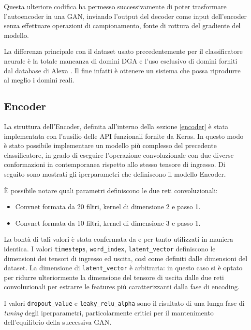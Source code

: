 Questa ulteriore codifica ha permesso successivamente di poter trasformare l'autoencoder in una GAN, inviando l'output del decoder come input dell'encoder senza effettuare operazioni di campionamento, fonte di rottura del gradiente del modello.

La differenza principale con il dataset usato precedentemente per il classificatore neurale è la totale mancanza di domini DGA e l'uso esclusivo di domini forniti dal database di Alexa \cite{amazon:alexa}. Il fine infatti è ottenere un sistema che possa riprodurre al meglio i domini reali.


\subsection{Encoder}
La struttura dell'Encoder, definita all'interno della sezione \ref{encoder} è stata implementata con l'ausilio delle API funzionali fornite da Keras. In questo modo è stato possibile implementare un modello più complesso del precedente classificatore, in grado di eseguire l'operazione convoluzionale con due diverse conformazioni in contemporanea rispetto allo stesso tensore di ingresso. Di seguito sono mostrati gli iperparametri che definiscono il modello Encoder. 



\`E possibile notare quali parametri definiscono le due reti convoluzionali:
\begin{itemize}
\item Convnet formata da 20 filtri, kernel di dimensione 2 e passo 1.
\item Convnet formata da 10 filtri, kernel di dimensione 3 e passo 1.
\end{itemize}

La bontà di tali valori è stata confermata da \cite{deepdga} e per tanto utilizzati in maniera identica.
I valori \lstinline!timesteps!, \lstinline!word_index!, \lstinline!latent_vector! definiscono le dimensioni dei tensori di ingresso ed uscita, così come definiti dalle dimensioni del dataset. La dimensione di \lstinline!latent_vector! è arbitraria: in questo caso si è optato per  ridurre ulteriormente la dimensione del tensore di uscita dalle due reti convoluzionali per estrarre le features più caratterizzanti dalla fase di encoding.

I valori \lstinline!dropout_value! e \lstinline!leaky_relu_alpha! sono il risultato di una lunga fase di \textit{tuning} degli iperparametri, particolarmente critici per il mantenimento dell'equilibrio della successiva GAN.

